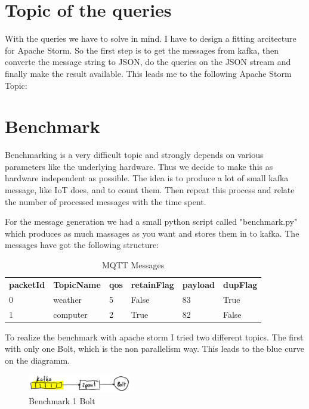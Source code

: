 \newpage
\section{Topic of the queries}
With the queries we have to solve in mind. I have to design a fitting arcitecture for Apache Storm.
So the first step is to get the messages from kafka, then converte the message string to JSON,
do the queries on the JSON stream and finally make the result available.
\medskip
This leads me to the following Apache Storm Topic:



\newpage
\section{Benchmark}

Benchmarking is a very difficult topic and strongly depends on various parameters like the underlying hardware.
Thus we decide to make this as hardware independent as possible.
The idea is to produce a lot of small kafka message, like IoT does,
and to count them. Then repeat this process and relate the number of processed messages with the time spent.

For the message generation we had a small python script called "benchmark.py" which produces as much massages as you want
and stores them in to kafka.
The messages have got the following structure:

\begin{table}[h!]
 \centering
 \begin{tabular}{llllll}
   \textbf{packetId}  & \textbf{TopicName} & \textbf{qos} & \textbf{retainFlag} & \textbf{payload} & \textbf{dupFlag} \\
   0 & weather & 5 & False & 83 & True \\
   1 & computer & 2 & True & 82 & False \\
 \end{tabular}
 \caption{MQTT Messages}
 \label{tab:messages}
\end{table}

To realize the benchmark with apache storm I tried two different topics.
The first with only one Bolt, which is the non parallelism way. This leads to the blue curve on the diagramm.
\begin{figure}[H]
\centering
\captionsetup{justification=centering}
\includegraphics[width=0.4\textwidth]{images/benchmark_topic1.png}
\caption[Benchmark 1 Bolt]{Benchmark 1 Bolt}
\end{figure}

